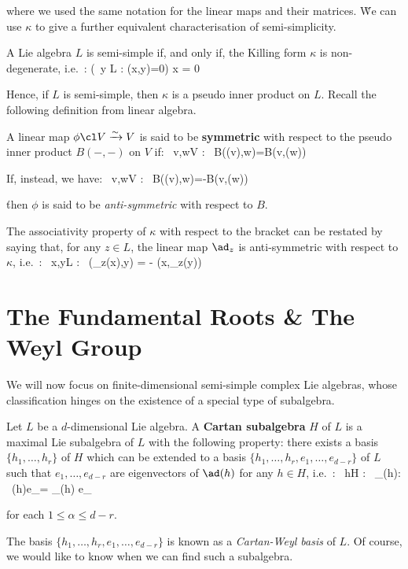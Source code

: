 where we used the same notation for the linear maps and their matrices. \v

We can use $\kappa$ to give a further equivalent characterisation of semi-simplicity.

A Lie algebra $L$ is semi-simple if, and only if, the Killing form $\kappa$ is non-degenerate, i.e.\ :
\bse
(\forall \, y \in L : \kappa(x,y)=0) \Rightarrow x = 0
\ese
\et

Hence, if $L$ is semi-simple, then $\kappa$ is a pseudo inner product on $L$. Recall the following definition from
linear algebra.

A linear map $\phi\cl V\xrightarrow{\sim}V$ is said to be \textbf{symmetric} with respect to the pseudo inner product
$B(-,-)$ on $V$ if:
\bse
\forall \, v,w\in V : \ B(\phi(v),w)=B(v,\phi(w))
\ese

If, instead, we have:
\bse
\forall \, v,w\in V : \ B(\phi(v),w)=-B(v,\phi(w))
\ese

\v

then $\phi$ is said to be \emph{anti-symmetric} with respect to $B$.
\ed

The associativity property of $\kappa$ with respect to the bracket can be restated by saying that, for any $z\in L$,
the linear map $\ad_z$ is anti-symmetric with respect to $\kappa$, i.e.\ :
\bse
\forall \, x,y\in L : \ \kappa(\ad_z(x),y) = - \kappa(x,\ad_z(y))
\ese

\section{The Fundamental Roots \& The Weyl Group}

We will now focus on finite-dimensional semi-simple complex Lie algebras, whose classification hinges on the
existence of a special type of subalgebra.

Let $L$ be a $d$-dimensional Lie algebra. A \textbf{Cartan subalgebra} $H$ of $L$ is a maximal Lie subalgebra of $L$
with the following property: there exists a basis $\{h_1,\ldots,h_r\}$ of $H$ which can be extended to a basis
$\{h_1,\ldots,h_r,e_1,\ldots,e_{d-r}\}$ of $L$ such that $e_1,\ldots,e_{d-r}$ are eigenvectors of $\ad(h)$ for any
$h\in H$, i.e.\ :
\bse
\forall \, h\in H : \exists \, \lambda_\alpha(h)\in \C : \ \ad(h)e_\alpha = \lambda_\alpha(h) e_\alpha
\ese

for each $1\leq\alpha\leq d-r$.
\ed

The basis $\{h_1,\ldots,h_r,e_1,\ldots,e_{d-r}\}$ is known as a \emph{Cartan-Weyl basis} of $L$. Of course, we would
like to know when we can find such a subalgebra.

